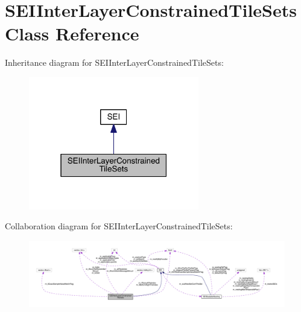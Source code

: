 \hypertarget{class_s_e_i_inter_layer_constrained_tile_sets}{}\section{S\+E\+I\+Inter\+Layer\+Constrained\+Tile\+Sets Class Reference}
\label{class_s_e_i_inter_layer_constrained_tile_sets}


Inheritance diagram for S\+E\+I\+Inter\+Layer\+Constrained\+Tile\+Sets\+:
\nopagebreak
\begin{figure}[H]
\begin{center}
\leavevmode
\includegraphics[width=211pt]{dc/d7b/class_s_e_i_inter_layer_constrained_tile_sets__inherit__graph}
\end{center}
\end{figure}


Collaboration diagram for S\+E\+I\+Inter\+Layer\+Constrained\+Tile\+Sets\+:
\nopagebreak
\begin{figure}[H]
\begin{center}
\leavevmode
\includegraphics[width=350pt]{dd/d68/class_s_e_i_inter_layer_constrained_tile_sets__coll__graph}
\end{center}
\end{figure}
